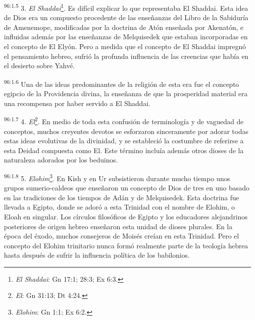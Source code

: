 \par
\textsuperscript{96:1.5} 3. \textit{El Shaddai}\footnote{\textit{El Shaddai}: Gn 17:1; 28:3; Ex 6:3.}. Es difícil explicar lo que representaba El Shaddai. Esta idea de Dios era un compuesto procedente de las enseñanzas del Libro de la Sabiduría de Amenemope, modificadas por la doctrina de Atón enseñada por Akenatón, e influidas además por las enseñanzas de Melquisedek que estaban incorporadas en el concepto de El Elyón. Pero a medida que el concepto de El Shaddai impregnó el pensamiento hebreo, sufrió la profunda influencia de las creencias que había en el desierto sobre Yahvé.

\par
\textsuperscript{96:1.6} Una de las ideas predominantes de la religión de esta era fue el concepto egipcio de la Providencia divina, la enseñanza de que la prosperidad material era una recompensa por haber servido a El Shaddai.

\par
\textsuperscript{96:1.7} 4. \textit{El}\footnote{\textit{El}: Gn 31:13; Dt 4:24.}. En medio de toda esta confusión de terminología y de vaguedad de conceptos, muchos creyentes devotos se esforzaron sinceramente por adorar todas estas ideas evolutivas de la divinidad, y se estableció la costumbre de referirse a esta Deidad compuesta como El. Este término incluía además otros dioses de la naturaleza adorados por los beduinos.

\par
\textsuperscript{96:1.8} 5. \textit{Elohim}\footnote{\textit{Elohim}: Gn 1:1; Ex 6:2.}. En Kish y en Ur subsistieron durante mucho tiempo unos grupos sumerio-caldeos que enseñaron un concepto de Dios de tres en uno basado en las tradiciones de los tiempos de Adán y de Melquisedek. Esta doctrina fue llevada a Egipto, donde se adoró a esta Trinidad con el nombre de Elohim, o Eloah en singular. Los círculos filosóficos de Egipto y los educadores alejandrinos posteriores de origen hebreo enseñaron esta unidad de dioses plurales. En la época del éxodo, muchos consejeros de Moisés creían en esta Trinidad. Pero el concepto del Elohim trinitario nunca formó realmente parte de la teología hebrea hasta después de sufrir la influencia política de los babilonios.

